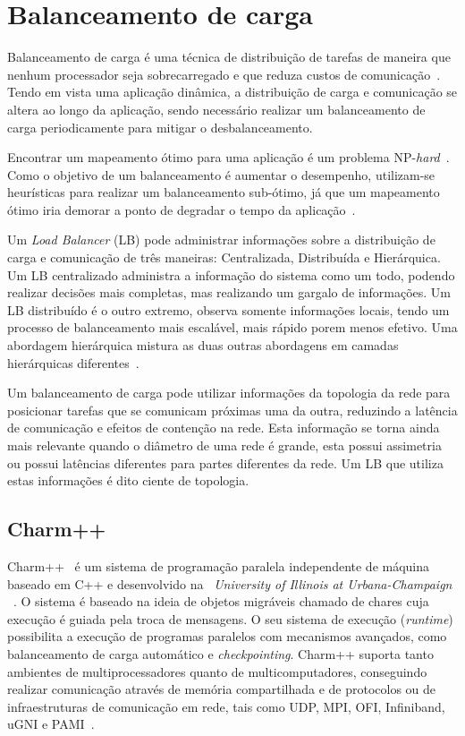 \documentclass[
	12pt,				%
	openright,			%
	twoside,			%
	a4paper,			%
	english,			%
	brazil,				%
	]{abntex2}
\newcommand{\chares}{{chares}\xspace}
\newcommand{\charm}{{{Charm++}}\xspace}
\begin{document}
\section{Balanceamento de carga}
\label{sec:lb}

Balanceamento de carga é uma técnica de distribuição de tarefas de maneira que nenhum processador seja sobrecarregado e que reduza custos de comunicação~\cite{Becker}. 
Tendo em vista uma aplicação dinâmica, a distribuição de carga e comunicação se altera ao longo da aplicação, sendo necessário realizar um balanceamento de carga periodicamente para mitigar o desbalanceamento. 

Encontrar um mapeamento ótimo para uma aplicação é um problema NP-\textit{hard}~\cite{leung}. 
Como o objetivo de um balanceamento é aumentar o desempenho, utilizam-se heurísticas para realizar um balanceamento sub-ótimo, já que um mapeamento ótimo iria demorar a ponto de degradar o tempo da aplicação~\cite{pilla-thesis}.

Um \textit{Load Balancer} (LB) pode administrar informações sobre a distribuição de carga e comunicação de três maneiras: Centralizada, Distribuída e Hierárquica.
Um LB centralizado administra a informação do sistema como um todo, podendo realizar decisões mais completas, mas realizando um gargalo de informações. 
Um LB distribuído é o outro extremo, observa somente informações locais, tendo um processo de balanceamento mais escalável, mais rápido porem menos efetivo. 
Uma abordagem hierárquica mistura as duas outras abordagens em camadas hierárquicas diferentes~\cite{Becker}.

Um balanceamento de carga pode utilizar informações da topologia da rede para posicionar tarefas que se comunicam próximas uma da outra, reduzindo a latência de comunicação e efeitos de contenção na rede.
Esta informação se torna ainda mais relevante quando o diâmetro de uma rede é grande, esta possui assimetria ou possui latências diferentes para partes diferentes da rede.
Um LB que utiliza estas informações é dito ciente de topologia.

\subsection{Charm++}
\label{sec:charm}

\charm ~\cite{website:CHARM} é um sistema de programação paralela independente de máquina baseado em C++ e desenvolvido na ~\textit{University of Illinois at Urbana-Champaign} ~\cite{Kale:charm}. 
O sistema é baseado na ideia de objetos migráveis chamado de \chares cuja execução é guiada pela troca de mensagens. 
O seu sistema de execução (\textit{runtime}) possibilita a execução de programas paralelos com mecanismos avançados, como balanceamento de carga automático e \textit{checkpointing}. 
\charm suporta tanto ambientes de multiprocessadores quanto de multicomputadores, conseguindo realizar comunicação através de memória compartilhada e de protocolos ou de infraestruturas de comunicação em rede, tais como UDP, MPI, OFI, Infiniband, uGNI e PAMI~\cite{pilla:CHARM}.
\end{document}
